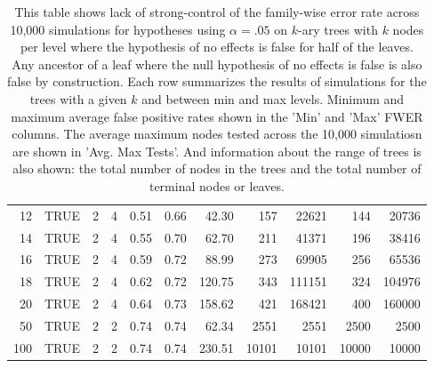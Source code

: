 \begin{table}[ht]
\begin{tabular}{rlrrrrrrrrr}
   12 & TRUE &   2 &   4 & 0.51 & 0.66 & 42.30 & 157 & 22621 & 144 & 20736 \\ 
   14 & TRUE &   2 &   4 & 0.55 & 0.70 & 62.70 & 211 & 41371 & 196 & 38416 \\ 
   16 & TRUE &   2 &   4 & 0.59 & 0.72 & 88.99 & 273 & 69905 & 256 & 65536 \\ 
   18 & TRUE &   2 &   4 & 0.62 & 0.72 & 120.75 & 343 & 111151 & 324 & 104976 \\ 
   20 & TRUE &   2 &   4 & 0.64 & 0.73 & 158.62 & 421 & 168421 & 400 & 160000 \\ 
   50 & TRUE &   2 &   2 & 0.74 & 0.74 & 62.34 & 2551 & 2551 & 2500 & 2500 \\ 
  100 & TRUE &   2 &   2 & 0.74 & 0.74 & 230.51 & 10101 & 10101 & 10000 & 10000 \\ 
   \bottomrule
\end{tabular}
\caption{This table shows  lack of strong-control
  of the family-wise error rate across 10,000 simulations for hypotheses using
  $\alpha=.05$ on $k$-ary trees with $k$ nodes per level where the hypothesis
  of no effects is false for half of the leaves. Any ancestor of a leaf where
  the null hypothesis of no effects is false is also false by construction.
  Each row summarizes the results of simulations for the trees with a given $k$
  and between min and max levels. Minimum and maximum average false positive
  rates shown in the 'Min' and 'Max' FWER columns. The average maximum nodes
  tested across the 10,000 simulatiosn are shown in 'Avg. Max Tests'. And
  information about the range of trees is also shown: the total number of nodes
  in the trees and the total number of terminal nodes or leaves.} 
\label{tab:strong_control_naive}
\end{table}
